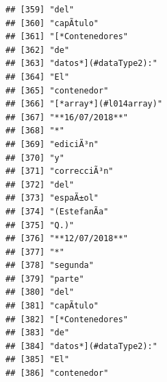\documentclass[
]{book}
\begin{document}
\begin{verbatim}
## [359] "del"                                                                              
## [360] "capÃ­tulo"                                                                        
## [361] "[*Contenedores"                                                                   
## [362] "de"                                                                               
## [363] "datos*](#dataType2):"                                                             
## [364] "El"                                                                               
## [365] "contenedor"                                                                       
## [366] "[*array*](#l014array)"                                                            
## [367] "**16/07/2018**"                                                                   
## [368] "*"                                                                                
## [369] "ediciÃ³n"                                                                         
## [370] "y"                                                                                
## [371] "correcciÃ³n"                                                                      
## [372] "del"                                                                              
## [373] "espaÃ±ol"                                                                         
## [374] "(EstefanÃ­a"                                                                      
## [375] "Q.)"                                                                              
## [376] "**12/07/2018**"                                                                   
## [377] "*"                                                                                
## [378] "segunda"                                                                          
## [379] "parte"                                                                            
## [380] "del"                                                                              
## [381] "capÃ­tulo"                                                                        
## [382] "[*Contenedores"                                                                   
## [383] "de"                                                                               
## [384] "datos*](#dataType2):"                                                             
## [385] "El"                                                                               
## [386] "contenedor"                                                                       

\end{verbatim}
\end{document}
